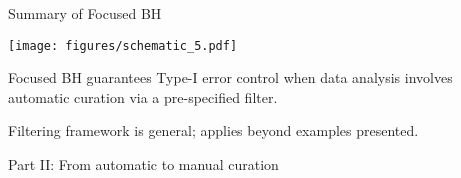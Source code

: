 \documentclass{beamer}
\begin{document}
%

\begin{frame}{Summary of Focused BH}
	
	\texttt{[image: figures/schematic\_5.pdf]}
	\vspace{0.25in}
	
	Focused BH guarantees Type-I error control when data analysis involves automatic curation via a pre-specified filter.
	\vspace{0.1in}
	
	Filtering framework is general; applies beyond examples presented.
		
\end{frame}


\begin{frame}
	\centering
	\LARGE
	\color{beamer@blendedblue}
	
	Part II: From automatic to manual curation
	
\end{frame}
\end{document}
